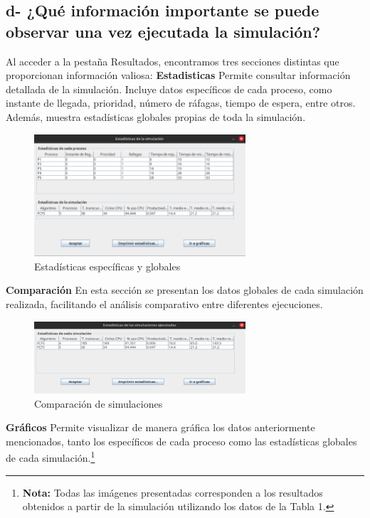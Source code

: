 \documentclass{article}
\begin{document}
\subsection*{d- ¿Qué información importante se puede observar una vez ejecutada la simulación?}

\noindent
Al acceder a la pestaña Resultados, encontramos tres secciones distintas que proporcionan información valiosa:
\textbf{Estadisticas}
Permite consultar información detallada de la simulación. Incluye datos específicos de cada proceso, como instante de llegada,
prioridad, número de ráfagas, tiempo de espera, entre otros. Además, muestra estadísticas globales propias de toda la simulación.
\begin{figure}[h]
  \centering
  \includegraphics[width=0.7\textwidth]{resources/3dEst.png}
  \caption{Estadísticas específicas y globales}
\end{figure}

\noindent
\textbf{Comparación}
En esta sección se presentan los datos globales de cada simulación realizada, facilitando el análisis comparativo entre
diferentes ejecuciones.
\begin{figure}[h]
  \centering
  \includegraphics[width=0.7\textwidth]{resources/3dComp.png}
  \caption{Comparación de simulaciones}
\end{figure}

\noindent
\textbf{Gráficos}
Permite visualizar de manera gráfica los datos anteriormente mencionados, tanto los específicos de cada proceso como las
estadísticas globales de cada simulación.\footnote{\textbf{Nota:} Todas las imágenes presentadas corresponden a los resultados obtenidos a partir de la 
simulación utilizando los datos de la Tabla 1.}
\end{document}

